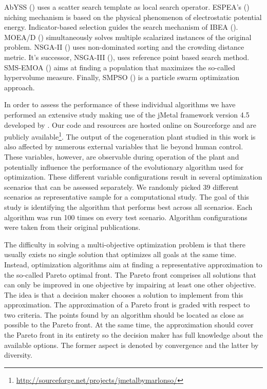 AbYSS (\cite{abyss}) uses a scatter search template as local search operator. ESPEA's (\cite{espea}) niching mechanism is based on the physical phenomenon of electrostatic potential energy. Indicator-based selection guides the search mechanism of IBEA (\cite{ibea}). MOEA/D (\cite{moead2009}) simultaneously solves multiple scalarized instances of the original problem. NSGA-II (\cite{nsga2}) uses non-dominated sorting and the crowding distance metric. It's successor, NSGA-III (\cite{nsga3part1}), uses reference point based search method. SMS-EMOA (\cite{smsemoa}) aims at finding a population that maximizes the so-called hypervolume measure. Finally, SMPSO (\cite{smpso}) is a particle swarm optimization approach.

In order to assess the performance of these individual algorithms we have performed an extensive study making use of the jMetal framework version 4.5 developed by \cite{jmetal2}. Our code and resources are hosted online on Sourceforge and are publicly available\footnote{\url{http://sourceforge.net/projects/jmetalbymarlonso/}}. The output of the cogeneration plant studied in this work is also affected by numerous external variables  that lie beyond human control. These variables, however, are observable during operation of the plant and potentially influence the performance of the evolutionary algorithm used for optimization. These different variable configurations result in several optimization scenarios that can be assessed separately. We randomly picked 39 different scenarios as representative sample for a computational study. The goal of this study is identifying the algorithm that performs best across all scenarios. Each algorithm was run 100 times on every test scenario. Algorithm configurations were taken from their original publications.

The difficulty in solving a multi-objective optimization problem is that there usually exists no single solution that optimizes all goals at the same time. Instead, optimization algorithms aim at finding a representative approximation to the so-called Pareto optimal front. The Pareto front comprises all solutions that can only be improved in one objective by impairing at least one other objective. The idea is that a decision maker chooses a solution to implement from this approximation. The approximation of a Pareto front is graded with respect to two criteria. The points found by an algorithm should be located as close as possible to the Pareto front. At the same time, the approximation should cover the Pareto front in its entirety so the decision maker has full knowledge about the available options. The former aspect is denoted by convergence and the latter by diversity.


